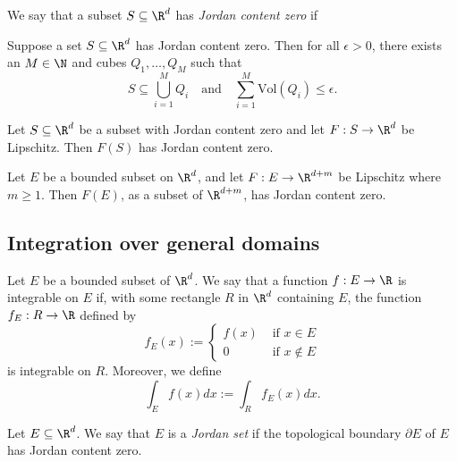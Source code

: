 \begin{definition}
    We say that a subset $S \subseteq \R^d$ has \emph{Jordan content zero} if
    \begin{myCenter}
    \end{myCenter}
\end{definition}

\begin{lemma}
    Suppose a set $S \subseteq \R^d$ has Jordan content zero. Then for all $\epsilon > 0$,
    there exists an $M \in \N$ and cubes $Q_1,\dots,Q_M$ such that
    $$S \subseteq \bigcup_{i=1}^MQ_i \quad\text{and}\quad \sum_{i=1}^M\text{Vol}(Q_i) \le \epsilon.$$
\end{lemma}

\begin{proposition}
    Let $S \subseteq \R^d$ be a subset with Jordan content zero and let $F:S\to\R^d$ be Lipschitz.
    Then $F(S)$ has Jordan content zero.
\end{proposition}

\begin{proposition}
    Let $E$ be a bounded subset on $\R^d$, and let $F:E \to \R^{d+m}$ be Lipschitz where $m\ge 1$.
    Then $F(E)$, as a subset of $\R^{d+m}$, has Jordan content zero.
\end{proposition}

\subsection{Integration over general domains}
\begin{definition}
    Let $E$ be a bounded subset of $\R^d$. We say that a function $f:E \to \R$ is integrable on $E$ if,
    with some rectangle $R$ in $\R^d$ containing $E$, the function $f_E: R \to \R$ defined by
    $$f_E(x):=\begin{cases}f(x) &\text{ if }x \in E \\0 &\text{ if } x \notin E \end{cases}$$
    is integrable on $R$. Moreover, we define
    $$\int_Ef(x)dx := \int_Rf_E(x)dx.$$
\end{definition}

\begin{definition}
    Let $E \subseteq \R^d$. We say that $E$ is a \emph{Jordan set} if the topological
    boundary $\partial E$ of $E$ has Jordan content zero.
\end{definition}

